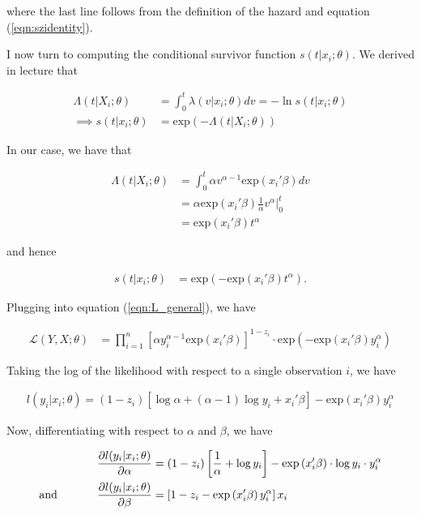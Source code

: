 \documentclass[]{report}
\newcommand{\0}{\bv{0}}
\newcommand{\1}{\bv{1}}
\newcommand{\parens}[1]{\left(#1\right)}
\newcommand{\prodonen}[2]{\prod_{#1=1}^n #2}
\renewcommand{\exp}[1]{\mathrm{exp}\parens{#1}}
\newcommand{\oneover}[1]{\frac{1}{#1}}
\begin{document}
\begin{enumerate}[1.]
\begin{enumerate}
where the last line follows from the definition of the hazard and equation (\ref{eqn:szidentity}).

I now turn to computing the conditional survivor function $s(t|x_i;\theta)$. We derived in lecture that 

\begin{align}
\Lambda(t|X_i; \theta) &= \int_{0}^{t} \lambda(v | x_i; \theta) dv = - \ln s(t| x_i; \theta)\\
\implies s(t|x_i; \theta) &= \exp{-\Lambda(t|X_i; \theta)}
\end{align}

In our case, we have that 

\begin{align}
	\Lambda(t|X_i; \theta) &= \int_{0}^{t} \alpha v^{\alpha -1} \exp{x_i' \beta} dv\\
	&= \alpha \exp{x_i' \beta} \frac{1}{\alpha} v^\alpha |^t_0\\
	&= \exp{x_i' \beta} t^\alpha
\end{align}

and hence 

\begin{align}
	s(t|x_i; \theta) &= \exp{-\exp{x_i' \beta} t^\alpha}.
\end{align}

Plugging into equation (\ref{eqn:L_general}), we have 

\begin{align}
\mathcal{L}(Y,X;\theta) &= \prodonen{i}{ \left[  \alpha y_i^{\alpha-1} \exp{x_i' \beta}  \right]^{1 - z_i} \cdot \exp{-\exp{x_i' \beta} y_i^\alpha} }
\end{align}

Taking the log of the likelihood with respect to a single observation $i$, we have

\begin{align}
	l(y_i | x_i ; \theta) = (1 -z_i) \left[ \log \alpha + (\alpha - 1) \log y_i + x_i' \beta  \right] - \exp{x_i' \beta} y_i^\alpha
\end{align}

Now, differentiating with respect to $\alpha$ and $\beta$, we have

\begin{align}
\frac{\partial l(y_i | x_i ; \theta)}{\partial \alpha} &= (1 - z_i) \left[ \oneover{\alpha} + \log y_i \right] - \exp{x_i' \beta} \cdot \log{y_i} \cdot y_i^\alpha\\
\text{and \hspace{1cm} }  \frac{\partial l(y_i | x_i ; \theta)}{\partial \beta} &= \left[ 1 - z_i - \exp{x_i' \beta} y_i^\alpha \right] x_i
\end{align}


\end{enumerate}
\end{enumerate}
\end{document}
